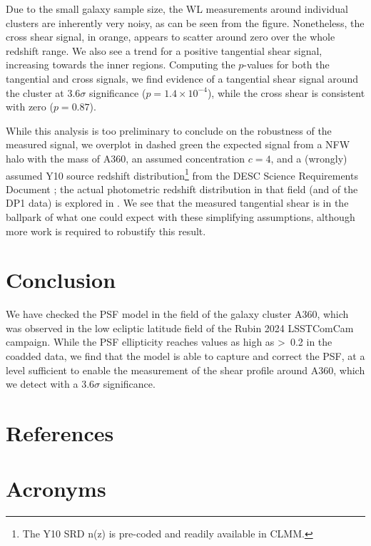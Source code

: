 \documentclass[SE,lsstdraft,authoryear,toc]{lsstdoc}
\begin{document}
Due to the small galaxy sample size, the WL measurements around individual clusters are inherently very noisy, as can be seen from the figure. Nonetheless, the cross shear signal, in orange, appears to scatter around zero over the whole redshift range. We also see a trend for a positive tangential shear signal, increasing towards the inner regions. Computing the $p$-values for both the tangential and cross signals, we find evidence of a tangential shear signal around the cluster at $3.6\sigma$ significance ($p = 1.4 \times 10^{-4}$), while the cross shear is consistent with zero ($p = 0.87$).

While this analysis is too preliminary to conclude on the robustness of the measured signal, we overplot in dashed green the expected signal from a NFW halo with the mass of A360, an assumed concentration $c=4$, and a (wrongly) assumed Y10 source redshift distribution\footnote{The Y10 SRD n(z) is pre-coded and readily available in CLMM.} from the DESC Science Requirements Document \citep{2018arXiv180901669T}; the actual photometric redshift distribution in that field (and of the DP1 data) is explored in . We see that the measured tangential shear is in the ballpark of what one could expect with these simplifying assumptions, although more work is required to robustify this result.


\section{Conclusion}
\label{sec:conclusion}
We have checked the PSF model in the field of the galaxy cluster A360, which was observed in the low ecliptic latitude field of the Rubin 2024 LSSTComCam campaign. While the PSF ellipticity reaches values as high as >~0.2 in the coadded data, we find that the model is able to capture and correct the PSF, at a level sufficient to enable the measurement of the shear profile around A360, which we detect with a 3.6$\sigma$ significance.


\appendix
\section{References} \label{sec:bib}
\renewcommand{\refname}{} %


\section{Acronyms} \label{sec:acronyms}

\end{document}
